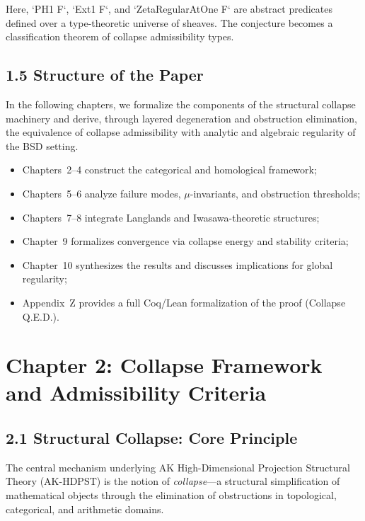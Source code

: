 \documentclass[11pt]{article}
\begin{document}
Here, `PH1 F`, `Ext1 F`, and `ZetaRegularAtOne F` are abstract predicates defined over a type-theoretic universe of sheaves. The conjecture becomes a classification theorem of collapse admissibility types.

\subsection*{1.5 Structure of the Paper}

In the following chapters, we formalize the components of the structural collapse machinery and derive, through layered degeneration and obstruction elimination, the equivalence of collapse admissibility with analytic and algebraic regularity of the BSD setting.

\begin{itemize}
  \item Chapters~2--4 construct the categorical and homological framework;
  \item Chapters~5--6 analyze failure modes, \( \mu \)-invariants, and obstruction thresholds;
  \item Chapters~7--8 integrate Langlands and Iwasawa-theoretic structures;
  \item Chapter~9 formalizes convergence via collapse energy and stability criteria;
  \item Chapter~10 synthesizes the results and discusses implications for global regularity;
  \item Appendix~Z provides a full Coq/Lean formalization of the proof (Collapse Q.E.D.).
\end{itemize}



\section{Chapter 2: Collapse Framework and Admissibility Criteria}
\label{sec:collapse-framework}

\subsection*{2.1 Structural Collapse: Core Principle}

The central mechanism underlying AK High-Dimensional Projection Structural Theory (AK-HDPST) is the notion of \emph{collapse}—a structural simplification of mathematical objects through the elimination of obstructions in topological, categorical, and arithmetic domains.
\end{document}
